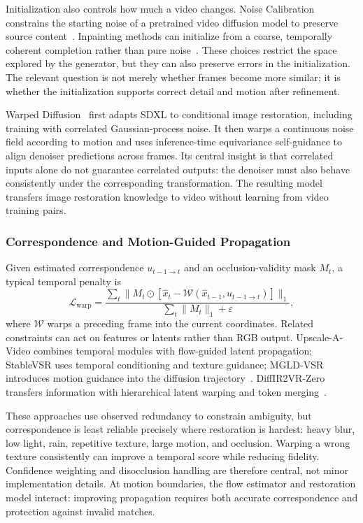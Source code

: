 Initialization also controls how much a video changes. Noise Calibration constrains the starting noise of a pretrained video diffusion model to preserve source content~\cite{ncsdedit}. Inpainting methods can initialize from a coarse, temporally coherent completion rather than pure noise~\cite{diffueraser}. These choices restrict the space explored by the generator, but they can also preserve errors in the initialization. The relevant question is not merely whether frames become more similar; it is whether the initialization supports correct detail and motion after refinement.

Warped Diffusion~\cite{warped} first adapts SDXL to conditional image restoration, including training with correlated Gaussian-process noise. It then warps a continuous noise field according to motion and uses inference-time equivariance self-guidance to align denoiser predictions across frames. Its central insight is that correlated inputs alone do not guarantee correlated outputs: the denoiser must also behave consistently under the corresponding transformation. The resulting model transfers image restoration knowledge to video without learning from video training pairs.

\subsubsection{Correspondence and Motion-Guided Propagation}
Given estimated correspondence $u_{t-1\rightarrow t}$ and an occlusion-validity mask $M_t$, a typical temporal penalty is
\begin{equation}
\mathcal L_{\mathrm{warp}}=
\frac{\sum_t\|M_t\odot[\widehat x_t-\mathcal W(\widehat x_{t-1},u_{t-1\rightarrow t})]\|_1}
{\sum_t\|M_t\|_1+\varepsilon},
\label{eq:warp}
\end{equation}
where $\mathcal W$ warps a preceding frame into the current coordinates. Related constraints can act on features or latents rather than RGB output. Upscale-A-Video combines temporal modules with flow-guided latent propagation; StableVSR uses temporal conditioning and texture guidance; MGLD-VSR introduces motion guidance into the diffusion trajectory~\cite{upscale,stablevsr,mgld}. DiffIR2VR-Zero transfers information with hierarchical latent warping and token merging~\cite{diffir2vr}.

These approaches use observed redundancy to constrain ambiguity, but correspondence is least reliable precisely where restoration is hardest: heavy blur, low light, rain, repetitive texture, large motion, and occlusion. Warping a wrong texture consistently can improve a temporal score while reducing fidelity. Confidence weighting and disocclusion handling are therefore central, not minor implementation details. At motion boundaries, the flow estimator and restoration model interact: improving propagation requires both accurate correspondence and protection against invalid matches.

